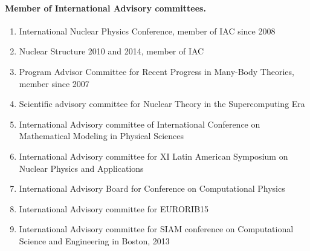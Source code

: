 \documentclass[%
oneside,                 %
final,                   %
10pt]{article}
\begin{document}
\noindent
\paragraph{Member of International Advisory committees.}
\begin{enumerate}
\item International Nuclear Physics Conference, member of IAC since 2008

\item Nuclear Structure 2010 and 2014, member of IAC

\item Program Advisor Committee for Recent Progress in Many-Body Theories, member since 2007

\item Scientific advisory committee for Nuclear Theory in the Supercomputing Era 

\item International Advisory committee of International Conference on Mathematical Modeling in Physical Sciences

\item International Advisory committee for XI Latin American Symposium on Nuclear Physics and Applications 

\item International Advisory Board for Conference on Computational Physics

\item International Advisory committee for EURORIB15

\item International Advisory committee for SIAM conference on Computational Science and Engineering in Boston, 2013
\end{enumerate}

\noindent
\end{document}
